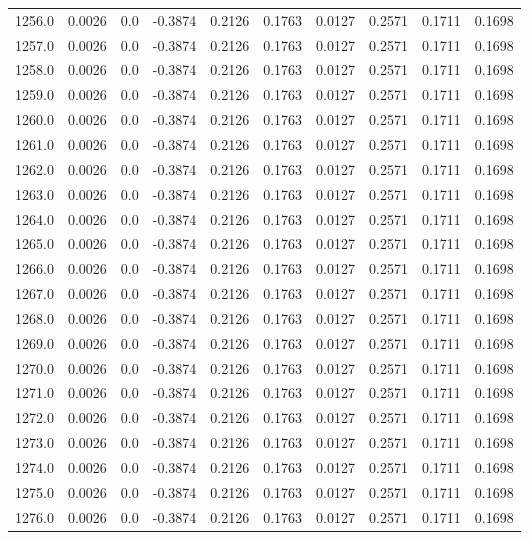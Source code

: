 \begin{longtable}{lrrrrrrrrr}
1256.0 & 0.0026 & 0.0 & -0.3874 & 0.2126 & 0.1763 & 0.0127 & 0.2571 & 0.1711 & 0.1698 \\
1257.0 & 0.0026 & 0.0 & -0.3874 & 0.2126 & 0.1763 & 0.0127 & 0.2571 & 0.1711 & 0.1698 \\
1258.0 & 0.0026 & 0.0 & -0.3874 & 0.2126 & 0.1763 & 0.0127 & 0.2571 & 0.1711 & 0.1698 \\
1259.0 & 0.0026 & 0.0 & -0.3874 & 0.2126 & 0.1763 & 0.0127 & 0.2571 & 0.1711 & 0.1698 \\
1260.0 & 0.0026 & 0.0 & -0.3874 & 0.2126 & 0.1763 & 0.0127 & 0.2571 & 0.1711 & 0.1698 \\
1261.0 & 0.0026 & 0.0 & -0.3874 & 0.2126 & 0.1763 & 0.0127 & 0.2571 & 0.1711 & 0.1698 \\
1262.0 & 0.0026 & 0.0 & -0.3874 & 0.2126 & 0.1763 & 0.0127 & 0.2571 & 0.1711 & 0.1698 \\
1263.0 & 0.0026 & 0.0 & -0.3874 & 0.2126 & 0.1763 & 0.0127 & 0.2571 & 0.1711 & 0.1698 \\
1264.0 & 0.0026 & 0.0 & -0.3874 & 0.2126 & 0.1763 & 0.0127 & 0.2571 & 0.1711 & 0.1698 \\
1265.0 & 0.0026 & 0.0 & -0.3874 & 0.2126 & 0.1763 & 0.0127 & 0.2571 & 0.1711 & 0.1698 \\
1266.0 & 0.0026 & 0.0 & -0.3874 & 0.2126 & 0.1763 & 0.0127 & 0.2571 & 0.1711 & 0.1698 \\
1267.0 & 0.0026 & 0.0 & -0.3874 & 0.2126 & 0.1763 & 0.0127 & 0.2571 & 0.1711 & 0.1698 \\
1268.0 & 0.0026 & 0.0 & -0.3874 & 0.2126 & 0.1763 & 0.0127 & 0.2571 & 0.1711 & 0.1698 \\
1269.0 & 0.0026 & 0.0 & -0.3874 & 0.2126 & 0.1763 & 0.0127 & 0.2571 & 0.1711 & 0.1698 \\
1270.0 & 0.0026 & 0.0 & -0.3874 & 0.2126 & 0.1763 & 0.0127 & 0.2571 & 0.1711 & 0.1698 \\
1271.0 & 0.0026 & 0.0 & -0.3874 & 0.2126 & 0.1763 & 0.0127 & 0.2571 & 0.1711 & 0.1698 \\
1272.0 & 0.0026 & 0.0 & -0.3874 & 0.2126 & 0.1763 & 0.0127 & 0.2571 & 0.1711 & 0.1698 \\
1273.0 & 0.0026 & 0.0 & -0.3874 & 0.2126 & 0.1763 & 0.0127 & 0.2571 & 0.1711 & 0.1698 \\
1274.0 & 0.0026 & 0.0 & -0.3874 & 0.2126 & 0.1763 & 0.0127 & 0.2571 & 0.1711 & 0.1698 \\
1275.0 & 0.0026 & 0.0 & -0.3874 & 0.2126 & 0.1763 & 0.0127 & 0.2571 & 0.1711 & 0.1698 \\
1276.0 & 0.0026 & 0.0 & -0.3874 & 0.2126 & 0.1763 & 0.0127 & 0.2571 & 0.1711 & 0.1698 \\

\end{longtable}

